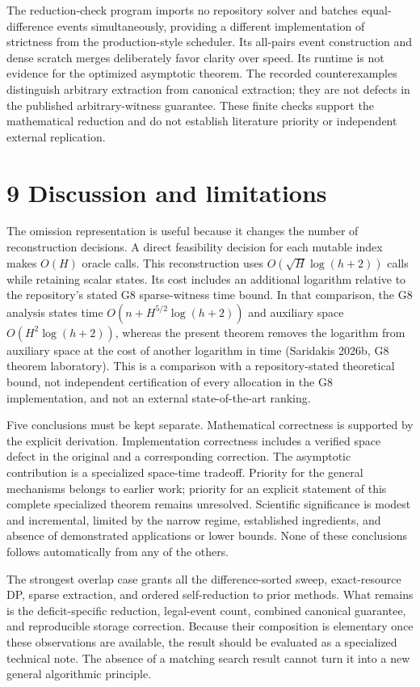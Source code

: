 \documentclass[
  11pt,
  letterpaper,
]{article}
\begin{document}
The reduction-check program imports no repository solver and batches
equal-difference events simultaneously, providing a different
implementation of strictness from the production-style scheduler. Its
all-pairs event construction and dense scratch merges deliberately favor
clarity over speed. Its runtime is not evidence for the optimized
asymptotic theorem. The recorded counterexamples distinguish arbitrary
extraction from canonical extraction; they are not defects in the
published arbitrary-witness guarantee. These finite checks support the
mathematical reduction and do not establish literature priority or
independent external replication.

\hypertarget{discussion-and-limitations}{%
\section{9 Discussion and
limitations}\label{discussion-and-limitations}}

The omission representation is useful because it changes the number of
reconstruction decisions. A direct feasibility decision for each mutable
index makes \(O(H)\) oracle calls. This reconstruction uses
\(O(\sqrt H\log(h+2))\) calls while retaining scalar states. Its cost
includes an additional logarithm relative to the repository's stated G8
sparse-witness time bound. In that comparison, the G8 analysis states
time \(O(n+H^{5/2}\log(h+2))\) and auxiliary space \(O(H^2\log(h+2))\),
whereas the present theorem removes the logarithm from auxiliary space
at the cost of another logarithm in time (Saridakis 2026b, G8 theorem
laboratory). This is a comparison with a repository-stated theoretical
bound, not independent certification of every allocation in the G8
implementation, and not an external state-of-the-art ranking.

Five conclusions must be kept separate. Mathematical correctness is
supported by the explicit derivation. Implementation correctness
includes a verified space defect in the original and a corresponding
correction. The asymptotic contribution is a specialized space-time
tradeoff. Priority for the general mechanisms belongs to earlier work;
priority for an explicit statement of this complete specialized theorem
remains unresolved. Scientific significance is modest and incremental,
limited by the narrow regime, established ingredients, and absence of
demonstrated applications or lower bounds. None of these conclusions
follows automatically from any of the others.

The strongest overlap case grants all the difference-sorted sweep,
exact-resource DP, sparse extraction, and ordered self-reduction to
prior methods. What remains is the deficit-specific reduction,
legal-event count, combined canonical guarantee, and reproducible
storage correction. Because their composition is elementary once these
observations are available, the result should be evaluated as a
specialized technical note. The absence of a matching search result
cannot turn it into a new general algorithmic principle.
\end{document}
